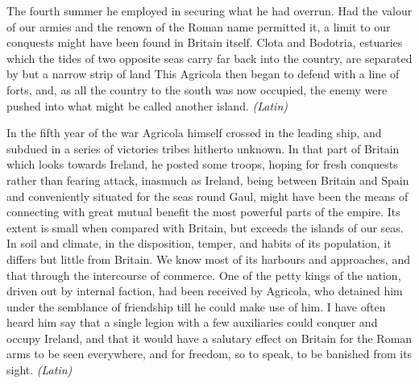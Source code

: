 The fourth summer he employed in securing what he had overrun. Had the valour of our armies and the renown of the Roman name permitted it, a limit to our conquests might have been found in Britain itself. Clota and Bodotria, estuaries which the tides of two opposite seas carry far back into the country, are separated by but a narrow strip of land This Agricola then began to defend with a line of forts, and, as all the country to the south was now occupied, the enemy were pushed into what might be called another island. \emph{(Latin)}


In the fifth year of the war Agricola himself crossed in the leading ship, and subdued in a series of victories tribes hitherto unknown. In that part of Britain which looks towards Ireland, he posted some troops, hoping for fresh conquests rather than fearing attack, inasmuch as Ireland, being between Britain and Spain and conveniently situated for the seas round Gaul, might have been the means of connecting with great mutual benefit the most powerful parts of the empire. Its extent is small when compared with Britain, but exceeds the islands of our seas. In soil and climate, in the disposition, temper, and habits of its population, it differs but little from Britain. We know most of its harbours and approaches, and that through the intercourse of commerce. One of the petty kings of the nation, driven out by internal faction, had been received by Agricola, who detained him under the semblance of friendship till he could make use of him. I have often heard him say that a single legion with a few auxiliaries could conquer and occupy Ireland, and that it would have a salutary effect on Britain for the Roman arms to be seen everywhere, and for freedom, so to speak, to be banished from its sight. \emph{(Latin)}


